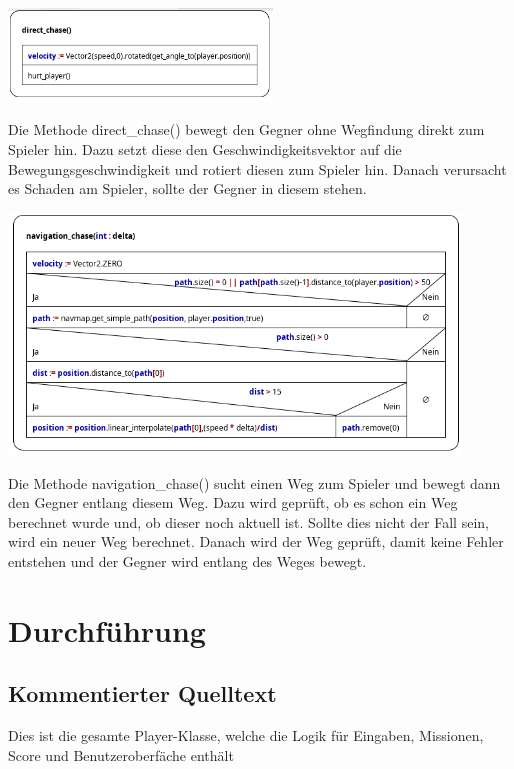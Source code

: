 \documentclass{article}
\begin{document}
	\begin{centering}
		\includegraphics[width=7cm]{direct.png}\\
	\end{centering}
	Die Methode direct\_chase() bewegt den Gegner ohne Wegfindung direkt zum Spieler hin. Dazu setzt diese den Geschwindigkeitsvektor auf die Bewegungsgeschwindigkeit und rotiert diesen zum Spieler hin. Danach verursacht es Schaden am Spieler, sollte der Gegner in diesem stehen.\\
	
	\begin{centering}
		\includegraphics[width=12cm]{nav.png}\\
	\end{centering}
	Die Methode navigation\_chase() sucht einen Weg zum Spieler und bewegt dann den Gegner entlang diesem Weg. Dazu wird geprüft, ob es schon ein Weg berechnet wurde und, ob dieser noch aktuell ist. Sollte dies nicht der Fall sein, wird ein neuer Weg berechnet. Danach wird der Weg geprüft, damit keine Fehler entstehen und der Gegner wird entlang des Weges bewegt.

	\section{Durchführung}
	\subsection{Kommentierter Quelltext}
	
	Dies ist die gesamte Player-Klasse, welche die Logik für Eingaben, Missionen, Score und Benutzeroberfäche enthält
	
\end{document}
